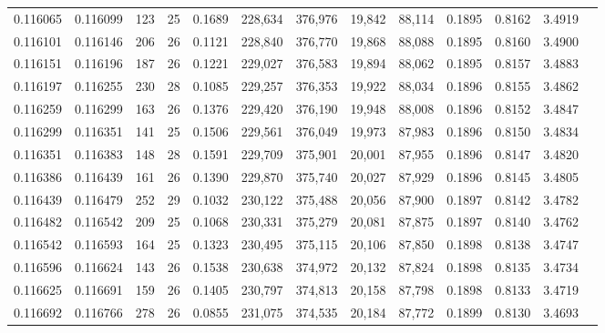 \begin{tabular}{rrrrrrrrrrrrr}
0.116065 & 0.116099 & 123 &  25 &                                     0.1689 & 228,634 & 376,976 &  19,842 &  88,114 & 0.1895 & 0.8162 & 3.4919 \\
0.116101 & 0.116146 & 206 &  26 &                                     0.1121 & 228,840 & 376,770 &  19,868 &  88,088 & 0.1895 & 0.8160 & 3.4900 \\
0.116151 & 0.116196 & 187 &  26 &                                     0.1221 & 229,027 & 376,583 &  19,894 &  88,062 & 0.1895 & 0.8157 & 3.4883 \\
0.116197 & 0.116255 & 230 &  28 &                                     0.1085 & 229,257 & 376,353 &  19,922 &  88,034 & 0.1896 & 0.8155 & 3.4862 \\
0.116259 & 0.116299 & 163 &  26 &                                     0.1376 & 229,420 & 376,190 &  19,948 &  88,008 & 0.1896 & 0.8152 & 3.4847 \\
0.116299 & 0.116351 & 141 &  25 &                                     0.1506 & 229,561 & 376,049 &  19,973 &  87,983 & 0.1896 & 0.8150 & 3.4834 \\
0.116351 & 0.116383 & 148 &  28 &                                     0.1591 & 229,709 & 375,901 &  20,001 &  87,955 & 0.1896 & 0.8147 & 3.4820 \\
0.116386 & 0.116439 & 161 &  26 &                                     0.1390 & 229,870 & 375,740 &  20,027 &  87,929 & 0.1896 & 0.8145 & 3.4805 \\
0.116439 & 0.116479 & 252 &  29 &                                     0.1032 & 230,122 & 375,488 &  20,056 &  87,900 & 0.1897 & 0.8142 & 3.4782 \\
0.116482 & 0.116542 & 209 &  25 &                                     0.1068 & 230,331 & 375,279 &  20,081 &  87,875 & 0.1897 & 0.8140 & 3.4762 \\
0.116542 & 0.116593 & 164 &  25 &                                     0.1323 & 230,495 & 375,115 &  20,106 &  87,850 & 0.1898 & 0.8138 & 3.4747 \\
0.116596 & 0.116624 & 143 &  26 &                                     0.1538 & 230,638 & 374,972 &  20,132 &  87,824 & 0.1898 & 0.8135 & 3.4734 \\
0.116625 & 0.116691 & 159 &  26 &                                     0.1405 & 230,797 & 374,813 &  20,158 &  87,798 & 0.1898 & 0.8133 & 3.4719 \\
0.116692 & 0.116766 & 278 &  26 &                                     0.0855 & 231,075 & 374,535 &  20,184 &  87,772 & 0.1899 & 0.8130 & 3.4693 \\

\end{tabular}
